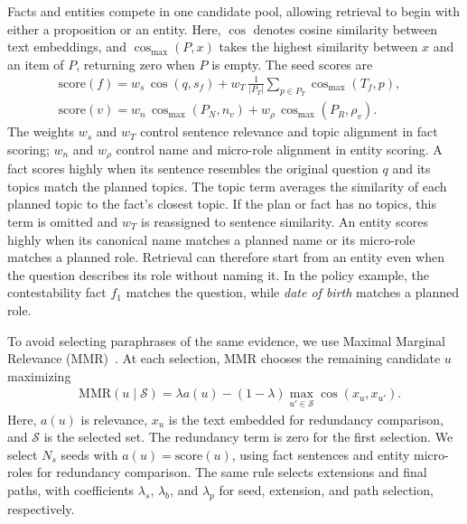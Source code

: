 \documentclass[sigconf, review, anonymous]{acmart}
\newcommand{\simcos}{\operatorname{cos}}
\begin{document}
Facts and entities compete in one candidate pool, allowing
retrieval to begin with either a proposition or an entity.
Here, $\simcos$ denotes cosine similarity between text
embeddings, and $\simcos_{\max}(P,x)$ takes the highest
similarity between $x$ and an item of $P$, returning zero
when $P$ is empty. The seed scores are
\begin{align*}
&\mathrm{score}(f)=
w_s\,\simcos(q,s_f)
+w_T\,\tfrac{1}{|P_T|}
\textstyle\sum_{p\in P_T}\simcos_{\max}(T_f,p), &&\\
&\mathrm{score}(v)=
w_n\,\simcos_{\max}(P_N,n_v)
+w_\rho\,\simcos_{\max}(P_R,\rho_v). &&
\end{align*}
The weights $w_s$ and $w_T$ control sentence relevance and
topic alignment in fact scoring; $w_n$ and $w_\rho$ control
name and micro-role alignment in entity scoring.
A fact scores highly when its sentence resembles the original
question $q$ and its topics match the planned topics. The topic
term averages the similarity of each planned topic to the fact's
closest topic. If the plan or fact has no topics, this term is
omitted and $w_T$ is reassigned to sentence similarity.
An entity scores highly when its canonical name matches a
planned name or its micro-role matches a planned role.
Retrieval can therefore start from an entity even when the
question describes its role without naming it. In the policy
example, the contestability fact $f_1$ matches the question,
while \emph{date of birth} matches a planned role.


To avoid selecting paraphrases of the same evidence, we use
Maximal Marginal Relevance (MMR)~\cite{carbonell1998use}.
At each selection, MMR chooses the remaining candidate $u$
maximizing
\begin{align*}
&\mathrm{MMR}(u\mid\mathcal{S})=\lambda a(u)-(1-\lambda)\max_{u'\in\mathcal{S}}
\simcos(x_u,x_{u'}).
\end{align*}
Here, $a(u)$ is relevance, $x_u$ is the text embedded for
redundancy comparison, and $\mathcal{S}$ is the selected set.
The redundancy term is zero for the first selection.
We select $N_s$ seeds with $a(u)=\mathrm{score}(u)$, using
fact sentences and entity micro-roles for redundancy comparison.
The same rule selects extensions and final paths, with
coefficients $\lambda_s$, $\lambda_b$, and $\lambda_p$
for seed, extension, and path selection, respectively.
\end{document}
